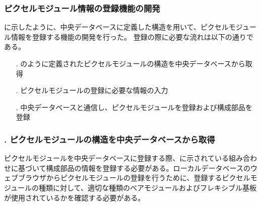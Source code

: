 

\subsubsection{ピクセルモジュール情報の登録機能の開発}
\label{sec:register-module}

に示したように、中央データベースに定義した構造を用いて、ピクセルモジュール情報を登録する機能の開発を行った。
登録の際に必要な流れは以下の通りである。
\begin{itemize}
  \item[\rnum{1}. ] のように定義されたピクセルモジュールの構造を中央データベースから取得
  \item[\rnum{2}. ] ピクセルモジュールの登録に必要な情報の入力
  \item[\rnum{3}. ] 中央データベースと通信し、ピクセルモジュールを登録および構成部品を登録
\end{itemize}

\subsubsection{. ピクセルモジュールの構造を中央データベースから取得}

ピクセルモジュールを中央データベースに登録する際、に示されている組み合わせに基づいて構成部品の情報を登録する必要がある。ローカルデータベースのウェブブラウザからピクセルモジュールの登録を行うために、登録するピクセルモジュールの種類に対して、適切な種類のベアモジュールおよびフレキシブル基板が使用されているかを確認する必要がある。

